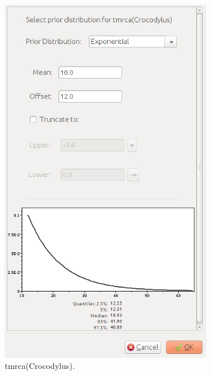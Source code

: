 {\begin{figure}[htbp]
        \begin{subfigure}[b]{0.35\textwidth}
            \includegraphics[width=\textwidth]{../screenshots/beauti-prior-crocodylus.jpg}
            \caption{tmrca(Crocodylus).}
            \label{fig:beautiPriorsCrocodylus}
        \end{subfigure}
        \begin{subfigure}[b]{0.35\textwidth}

\end{subfigure}
\end{figure}}
